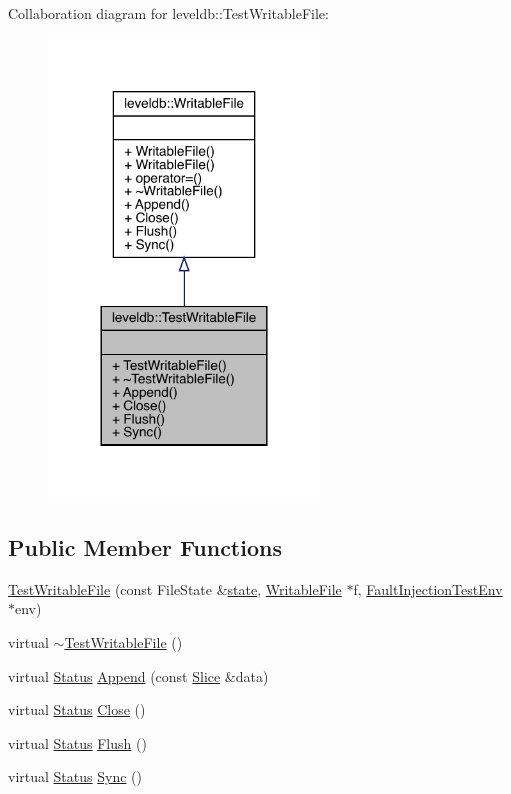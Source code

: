 Collaboration diagram for leveldb\+::Test\+Writable\+File\+:
\nopagebreak
\begin{figure}[H]
\begin{center}
\leavevmode
\includegraphics[width=204pt]{classleveldb_1_1_test_writable_file__coll__graph}
\end{center}
\end{figure}
\subsection*{Public Member Functions}
\begin{DoxyCompactItemize}
\item 
\mbox{\hyperlink{classleveldb_1_1_test_writable_file_aa7ca9d0df5ec92b331de04f0946bff4e}{Test\+Writable\+File}} (const File\+State \&\mbox{\hyperlink{version__set_8cc_a6aad002d0db5e5e85dc31927a5a6f503}{state}}, \mbox{\hyperlink{classleveldb_1_1_writable_file}{Writable\+File}} $\ast$f, \mbox{\hyperlink{classleveldb_1_1_fault_injection_test_env}{Fault\+Injection\+Test\+Env}} $\ast$env)
\item 
virtual \mbox{\hyperlink{classleveldb_1_1_test_writable_file_addaa3999b5a79da29cbaefb30ee48c11}{$\sim$\+Test\+Writable\+File}} ()
\item 
virtual \mbox{\hyperlink{classleveldb_1_1_status}{Status}} \mbox{\hyperlink{classleveldb_1_1_test_writable_file_a282d3c3c27ef70c65f467f50abfd93bb}{Append}} (const \mbox{\hyperlink{classleveldb_1_1_slice}{Slice}} \&data)
\item 
virtual \mbox{\hyperlink{classleveldb_1_1_status}{Status}} \mbox{\hyperlink{classleveldb_1_1_test_writable_file_a98284f2e88a705a3c18961f198e94038}{Close}} ()
\item 
virtual \mbox{\hyperlink{classleveldb_1_1_status}{Status}} \mbox{\hyperlink{classleveldb_1_1_test_writable_file_ad25b85a5ef462fe34e208f955c19d58e}{Flush}} ()
\item 
virtual \mbox{\hyperlink{classleveldb_1_1_status}{Status}} \mbox{\hyperlink{classleveldb_1_1_test_writable_file_aae96a812f1f2e82563b0900dfffaf1d1}{Sync}} ()
\end{DoxyCompactItemize}



